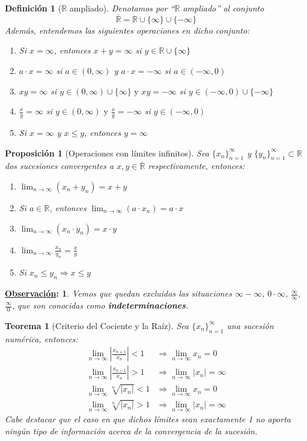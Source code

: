 \documentclass[10pt,a4paper,openright]{book}
\theoremstyle{break}
\newtheorem*{defi}{Definición}
\newtheorem*{theo}{Teorema}
\newtheorem*{prop}{Proposición}
\newtheorem*{obs}{\underline{Observación}:}
\begin{document}
\begin{defi}[$\mathbb{R}$ ampliado]
Denotamos por ``$\mathbb R$ ampliado'' al conjunto
$$\overline{\mathbb R}=\mathbb R\cup \{\infty\}\cup \{-\infty\}$$
Además, entendemos las siguientes operaciones en dicho conjunto:
\begin{enumerate}
\item Si $x=\infty$, entonces $x+y=\infty$ si $y\in \mathbb R\cup \{\infty\}$
\item $a\cdot x=\infty$ si $a\in (0,\infty)$ y $a\cdot x=-\infty $ si $a\in (-\infty, 0)$
\item $xy=\infty$ si $y\in (0,\infty)\cup\{\infty\} \mbox{ y } xy=-\infty$ si $y\in (-\infty,0)\cup\{-\infty\} $
\item $\frac{x}{y}=\infty $ si $y\in (0,\infty) \mbox{ y } \frac{x}{y}=-\infty $ si $y\in (-\infty,0) $
\item Si $x=\infty$ y $x\leq y$, entonces $y=\infty$
\end{enumerate}
\end{defi}

\begin{prop}[Operaciones con límites infinitos]
Sea $\{x_n\}_{n=1}^\infty$ y $\{y_n\}_{n=1}^\infty\subset \mathbb R$ dos sucesiones convergentes a $x,y\in \overline{\mathbb R}$ respectivamente, entonces:
\begin{enumerate}
\item $\lim_{n\rightarrow \infty}(x_n+y_n)=x+y$
\item Si $a\in \mathbb R$, entonces $\lim_{n\rightarrow \infty} (a\cdot x_n)=a\cdot x$
\item $\lim_{n\rightarrow \infty}(x_n\cdot y_n)=x\cdot y$
\item $\lim_{n\rightarrow \infty}\frac{x_n}{y_n}=\frac{x}{y}$
\item Si $x_n\leq y_n \Rightarrow x\leq y$
\end{enumerate}
\end{prop}

\begin{obs}
Vemos que quedan excluidas las situaciones $\infty -\infty$, $0\cdot \infty$, $\frac{\infty}{\infty}$, $\frac{\infty}{0}$, que son conocidas como \textbf{indeterminaciones}.
\end{obs}

\begin{theo}[Criterio del Cociente y la Raíz]
Sea $\{x_n\}_{n=1}^\infty$ una sucesión numérica, entonces:
\begin{align*}
\lim_{n\rightarrow \infty}\left|\frac{x_{n+1}}{x_n}\right|<1 &\Rightarrow \lim_{n\rightarrow \infty} x_n=0 \\
\lim_{n\rightarrow \infty}\left|\frac{x_{n+1}}{x_n}\right|>1 &\Rightarrow \lim_{n\rightarrow \infty} |x_n|=\infty \\
\lim_{n\rightarrow \infty}\sqrt[n]{|x_n|}<1 &\Rightarrow \lim_{n\rightarrow \infty} x_n=0\\
\lim_{n\rightarrow \infty}\sqrt[n]{|x_n|}>1 &\Rightarrow \lim_{n\rightarrow \infty} |x_n|=\infty
\end{align*}
Cabe destacar que el caso en que dichos límites sean exactamente 1 no aporta ningún tipo de información acerca de la convergencia de la sucesión.
\end{theo}
\end{document}
